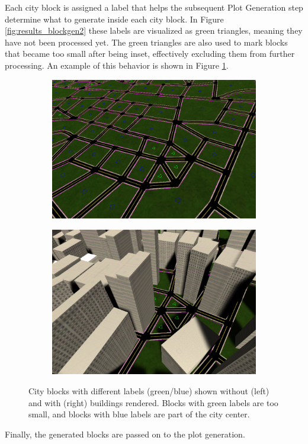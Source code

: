 Each city block is assigned a label that helps the subsequent Plot Generation step determine what to generate inside each city block.
In Figure \ref{fig:results_blockgen2} these labels are visualized as green triangles, meaning they have not been processed yet.
The green triangles are also used to mark blocks that became too small after being inset, effectively excluding them from further processing.
An example of this behavior is shown in Figure \ref{fig:results_blockgen3}.

\begin{figure}[h!]
  \centering
  \begin{subfigure}[b]{0.47\textwidth}
    \includegraphics[width=\textwidth]{figure/results_blockgen3.png}
  \end{subfigure}
  \quad
  \begin{subfigure}[b]{0.45\textwidth}
    \includegraphics[width=\textwidth]{figure/results_blockgen4.png}
  \end{subfigure}

  \caption{City blocks with different labels (green/blue) shown without (left) and with (right) buildings rendered. Blocks with green labels are too small, and blocks with blue labels are part of the city center.}
  \label{fig:results_blockgen3}
\end{figure}

Finally, the generated blocks are passed on to the plot generation.